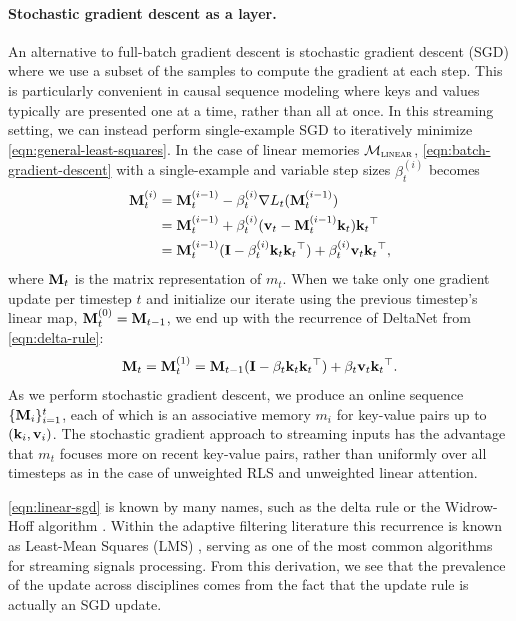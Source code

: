 \documentclass[notitlepage, 11pt]{article}
\newcommand*{\memory}{{m}}
\newcommand*{\linearfunctions}{{\Mcal_{\textsc{linear}}}}
\begin{document}
\paragraph{Stochastic gradient descent as a layer.}
An alternative to full-batch gradient descent is stochastic gradient descent (SGD) where we use a subset of the samples to compute the gradient at each step.
This is particularly convenient in causal sequence modeling where keys and values typically are presented one at a time, rather than all at once.
In this streaming setting, we can instead perform single-example SGD to iteratively minimize \autoref{eqn:general-least-squares}.
In the case of linear memories $\linearfunctions$, \autoref{eqn:batch-gradient-descent} with a single-example and variable step sizes $\beta_t^{(i)}$ becomes
\begin{align}
    \mathbf{M}_t^{(i)} &= \mathbf{M}_t^{(i-1)} - \beta_t^{(i)} \nabla L_t(\mathbf{M}_{t}^{(i-1)}) \label{eqn:sgd} \\
    &=\mathbf{M}_{t}^{(i-1)} + \beta_t^{(i)} (\mathbf{v}_t - \mathbf{M}_{t}^{(i-1)}\mathbf{k}_t)\mathbf{k}_t{}^\top \label{eqn:sgd-2} \\
    &= \mathbf{M}_{t}^{(i-1)}(\mathbf{I} - \beta_t^{(i)}\mathbf{k}_t\mathbf{k}_t{}^\top) + \beta_t^{(i)} \mathbf{v}_t\mathbf{k}_t{}^\top, 
\end{align}
where $\mathbf{M}_t$ is the matrix representation of $\memory_t$.
When we take only one gradient update per timestep $t$ and initialize our iterate using the previous timestep's linear map, $\mathbf{M}_t^{(0)} = \mathbf{M}_{t-1}$, we end up with the recurrence of DeltaNet \citep{Schlag2021LinearTransformersAre,Yang2024ParallelizingLinearTransformers} from \autoref{eqn:delta-rule}:
\begin{align}
    \mathbf{M}_t = \mathbf{M}_t^{(1)} = \mathbf{M}_{t-1}(\mathbf{I} - \beta_t\mathbf{k}_t\mathbf{k}_t{}^\top) + \beta_t \mathbf{v}_t\mathbf{k}_t{}^\top\label{eqn:linear-sgd}.
\end{align}
As we perform stochastic gradient descent, we produce an online sequence $\{\mathbf{M}_i\}_{i=1}^t$, each of which is an associative memory $\memory_i$ for key-value pairs up to $(\mathbf{k}_i, \mathbf{v}_i)$.
The stochastic gradient approach to streaming inputs has the advantage that $\memory_t$ focuses more on recent key-value pairs, rather than uniformly over all timesteps as in the case of unweighted RLS and unweighted linear attention.

\autoref{eqn:linear-sgd} is known by many names, such as the delta rule or the Widrow-Hoff algorithm \citep{Widrow1988AdaptiveSwitchingCircuits}.
Within the adaptive filtering literature this recurrence is known as Least-Mean Squares (LMS) \citep{Haykin2014AdaptiveFilterTheory}, serving as one of the most common algorithms for streaming signals processing.
From this derivation, we see that the prevalence of the update across disciplines comes from the fact that the update rule is actually an SGD update.
\end{document}
